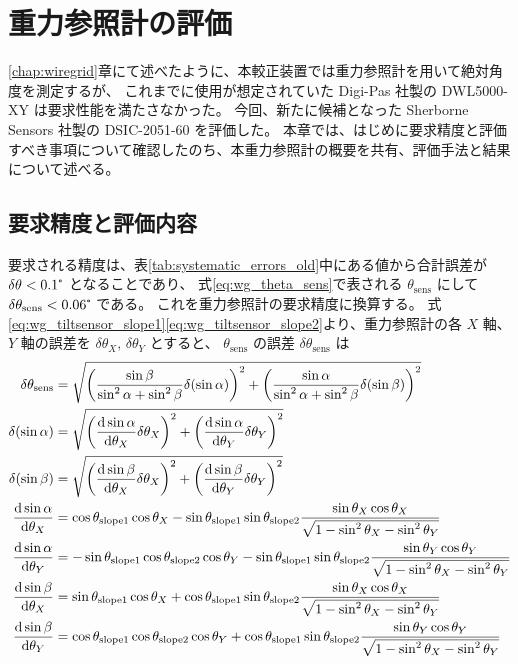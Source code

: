 \documentclass[../../main.tex]{subfiles}
\begin{document}
\chapter{重力参照計の評価}
\label{chap:tiltsensor}

\ref{chap:wiregrid}章にて述べたように、本較正装置では重力参照計を用いて絶対角度を測定するが、
これまでに使用が想定されていた Digi-Pas 社製の DWL5000-XY は要求性能を満たさなかった。
今回、新たに候補となった Sherborne Sensors 社製の DSIC-2051-60 を評価した。
本章では、はじめに要求精度と評価すべき事項について確認したのち、本重力参照計の概要を共有、評価手法と結果について述べる。
\section{要求精度と評価内容}
要求される精度は、表\ref{tab:systematic_errors_old}中にある値から合計誤差が $\delta\theta < 0.1\tcdegree$ となることであり、
式\eqref{eq:wg_theta_sens}で表される $\theta_{\mathrm{sens}}$ にして $\delta\theta_{\mathrm{sens}}<0.06\tcdegree$ である。
これを重力参照計の要求精度に換算する。
式\eqref{eq:wg_tiltsensor_slope1}\eqref{eq:wg_tiltsensor_slope2}より、重力参照計の各 $X$ 軸、$Y$ 軸の誤差を $\delta\theta_{X},\,\delta\theta_{Y}$ とすると、
$\theta_{\mathrm{sens}}$ の誤差 $\delta\theta_{\mathrm{sens}}$ は
\begin{align}
    \delta\theta_{\mathrm{sens}} &= 
        \sqrt{\qty(\dfrac{\sin\beta}{\sin^2\alpha+\sin^2\beta} \delta\qty(\sin\alpha))^2 + \qty(\dfrac{\sin\alpha}{\sin^2\alpha+\sin^2\beta} \delta\qty(\sin\beta))^2}\\ 
    \delta\qty(\sin\alpha) &= \sqrt{\qty(\dv{\sin\alpha}{\theta_X}\delta\theta_X)^2+\qty(\dv{\sin\alpha}{\theta_Y}\delta\theta_Y)^2}\\
    \delta\qty(\sin\beta) &= \sqrt{\qty(\dv{\sin\beta}{\theta_X}\delta\theta_X)^2+\qty(\dv{\sin\beta}{\theta_Y}\delta\theta_Y)^2} \\
    \dv{\sin\alpha}{\theta_X} &= \cos\theta_{\mathrm{slope}1}\cos\theta_X - \sin\theta_{\mathrm{slope}1}\sin\theta_{\mathrm{slope}2}\dfrac{\sin\theta_X\cos\theta_X}{\sqrt{1-\sin^2\theta_X-\sin^2\theta_Y}} \\
    \dv{\sin\alpha}{\theta_Y} &= -\sin\theta_{\mathrm{slope}1}\cos\theta_{\mathrm{slope}2}\cos\theta_Y - \sin\theta_{\mathrm{slope}1}\sin\theta_{\mathrm{slope}2}\dfrac{\sin\theta_Y\cos\theta_Y}{\sqrt{1-\sin^2\theta_X-\sin^2\theta_Y}} \\
    \dv{\sin\beta}{\theta_X} &= \sin\theta_{\mathrm{slope}1}\cos\theta_X + \cos\theta_{\mathrm{slope}1}\sin\theta_{\mathrm{slope}2}\dfrac{\sin\theta_X\cos\theta_X}{\sqrt{1-\sin^2\theta_X-\sin^2\theta_Y}} \\
    \dv{\sin\beta}{\theta_Y} &= \cos\theta_{\mathrm{slope}1}\cos\theta_{\mathrm{slope}2}\cos\theta_Y + \cos\theta_{\mathrm{slope}1}\sin\theta_{\mathrm{slope}2}\dfrac{\sin\theta_Y\cos\theta_Y}{\sqrt{1-\sin^2\theta_X-\sin^2\theta_Y}}
\end{align}
\end{document}
